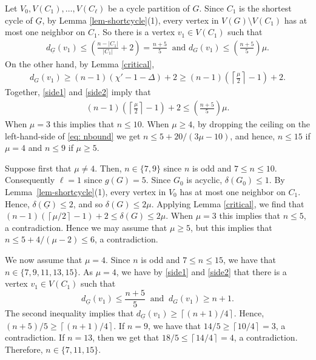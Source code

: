 \documentclass[12pt,oneside]{amsart}
\newcommand\roundup[1]{\left\lceil#1\right\rceil}
\begin{document}
Let $V_0, V(C_1), \ldots, V(C_\ell)$ be a cycle partition of $G$. Since $C_1$ is the shortest cycle of $\underline{G}$, by Lemma \ref{lem-shortcycle}(1),  every vertex in $V(G)\setminus V(C_1)$ has at most one neighbor on $C_1$. So there is a vertex $v_1\in V(C_1)$ such that
\begin{align}\label{side1}
d_{\underline{G}}(v_1)\le\left(\frac{n-|C_1|}{|C_1|}+2\right)= \frac{n+5}{5} \ \mbox{ and }   d_{G}(v_1) \le \left(\frac{n+5}{5}\right)\mu.
\end{align}
On the other hand, by Lemma \ref{critical},
\begin{align}\label{side2}
    d_{G}(v_1) \ge (n-1)(\chi'-1 -\Delta) +2 \ge (n-1)\left(\roundup{\frac{\mu}{2}}-1\right) +2.
\end{align}
Together, \eqref{side1} and \eqref{side2} imply that
\begin{align}\label{eq: nbound}
 (n-1) \left({\roundup{\frac{\mu}{{2}}}}-1\right) + 2\leq \left(\frac{n+5}{5}\right)\mu.
\end{align}
When $\mu=3$ this implies that $n\leq 10$. When $\mu\geq 4$, by dropping the ceiling on the left-hand-side of \eqref{eq: nbound} we get $n\leq 5+20/(3\mu-10)$, and hence, $n \le 15$ if $\mu=4$ and $n \le 9$ if $\mu\ge 5$.


Suppose first that $\mu \neq 4$. Then, $n\in\{7, 9\}$ since $n$ is odd and  $7\leq n\leq 10$. Consequently $\ell =1$ since $g(G) =5$.  Since $G_0$ is acyclic, $\delta(G_0) \le 1$.  By Lemma~\ref{lem-shortcycle}(1), every vertex in $V_0$ has at most one neighbor on $C_1$. Hence, $\delta(\underline{G}) \le 2$,  and so  $\delta(G) \le 2\mu$.  Applying Lemma \ref{critical}, we find that $(n-1) (\roundup{\mu/2}-1) + 2\leq \delta(G) \le 2\mu$. When $\mu=3$ this implies that $n\leq 5$, a contradiction. Hence we may assume that $\mu\geq 5$, but this implies that $n \le 5 + 4/(\mu - 2)\leq 6$, a contradiction.



We  now assume that $\mu=4$. Since $n$ is odd and $7\leq n\leq 15$, we have that $n\in\{7, 9, 11, 13, 15\}$.
As $\mu=4$, we have by \eqref{side1} and \eqref{side2} that there is a vertex $v_1\in V(C_1)$ such that
\[
d_{\underline{G}} (v_1)\leq \frac{n+5}5\ \mbox{ and } \ d_G(v_1)\geq n+1.
\]
The second inequality implies that $d_{\underline{G}}(v_1)\geq \roundup{(n+1)/4}$. Hence,  $(n+5)/5\geq \roundup{(n+1)/4}$. If $n=9$, we have that $14/5 \ge \roundup{10/4}=3$, a contradiction. If $n=13$, then we get that $18/5 \le \roundup{14/4}=4$, a contradiction. Therefore, $n\in \{ 7, 11, 15\}$.
\end{document}
